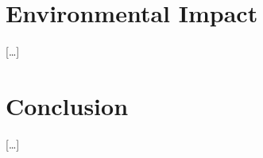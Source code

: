 \documentclass{article}
\begin{document}
{
    \section{Environmental Impact}
    \label{sec:env-impact}

    […]
}

{
    \section{Conclusion}
    \label{sec:conclusion}

    […]
}

{
    
}
\end{document}
